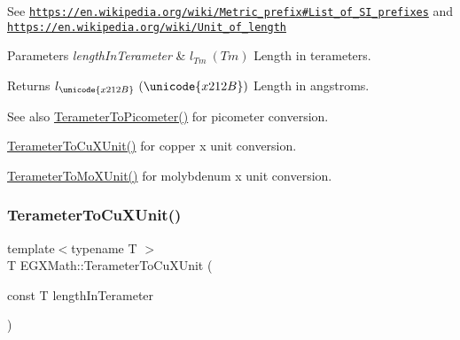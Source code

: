 See \href{https://en.wikipedia.org/wiki/Metric_prefix#List_of_SI_prefixes}{\tt https\+://en.\+wikipedia.\+org/wiki/\+Metric\+\_\+prefix\#\+List\+\_\+of\+\_\+\+S\+I\+\_\+prefixes} and \href{https://en.wikipedia.org/wiki/Unit_of_length}{\tt https\+://en.\+wikipedia.\+org/wiki/\+Unit\+\_\+of\+\_\+length} 
\begin{DoxyParams}{Parameters}
{\em length\+In\+Terameter} & $ l_{Tm}\ (Tm)$ Length in terameters. \\
\hline
\end{DoxyParams}
\begin{DoxyReturn}{Returns}
$ l_{\unicode{x212B}}\ (\unicode{x212B})$ Length in angstroms. 
\end{DoxyReturn}
\begin{DoxySeeAlso}{See also}
\mbox{\hyperlink{group___e_g_x_math-_conversions-_length_conversions-_s_i-_terameter-_s_i_ga131f3ccf4db05a31f5bd5c9487da9a4e}{Terameter\+To\+Picometer()}} for picometer conversion. 

\mbox{\hyperlink{group___e_g_x_math-_conversions-_length_conversions-_s_i-_terameter-_non-_s_i_ga5eab9d29867c570350691cca342c9472}{Terameter\+To\+Cu\+X\+Unit()}} for copper x unit conversion. 

\mbox{\hyperlink{group___e_g_x_math-_conversions-_length_conversions-_s_i-_terameter-_non-_s_i_ga391bcf9b529c2e20f2773c699bb0197a}{Terameter\+To\+Mo\+X\+Unit()}} for molybdenum x unit conversion. 
\end{DoxySeeAlso}
\mbox{\label{group___e_g_x_math-_conversions-_length_conversions-_s_i-_terameter-_non-_s_i_ga5eab9d29867c570350691cca342c9472}} 
\subsubsection{\texorpdfstring{Terameter\+To\+Cu\+X\+Unit()}{TerameterToCuXUnit()}}
{\footnotesize\ttfamily template$<$typename T $>$ \\
T E\+G\+X\+Math\+::\+Terameter\+To\+Cu\+X\+Unit (\begin{DoxyParamCaption}\item[{const T}]{length\+In\+Terameter }\end{DoxyParamCaption})}



